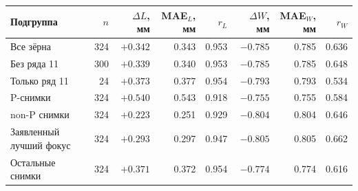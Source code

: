\begin{tabular}{@{}lrrrrrrr@{}}
\toprule
Подгруппа & $n$ & $\Delta L$, мм & MAE$_L$, мм & $r_L$ &
$\Delta W$, мм & MAE$_W$, мм & $r_W$ \\
\midrule
Все зёрна & 324 & $+\num{0.342}$ & \num{0.343} & \num{0.953} & $-\num{0.785}$ & \num{0.785} & \num{0.636} \\
Без ряда 11 & 300 & $+\num{0.339}$ & \num{0.340} & \num{0.953} & $-\num{0.785}$ & \num{0.785} & \num{0.648} \\
Только ряд 11 & 24 & $+\num{0.373}$ & \num{0.377} & \num{0.954} & $-\num{0.793}$ & \num{0.793} & \num{0.534} \\
P-снимки & 324 & $+\num{0.540}$ & \num{0.543} & \num{0.918} & $-\num{0.755}$ & \num{0.755} & \num{0.584} \\
non-P снимки & 324 & $+\num{0.223}$ & \num{0.251} & \num{0.929} & $-\num{0.804}$ & \num{0.804} & \num{0.646} \\
Заявленный лучший фокус & 324 & $+\num{0.293}$ & \num{0.297} & \num{0.947} & $-\num{0.805}$ & \num{0.805} & \num{0.662} \\
Остальные снимки & 324 & $+\num{0.371}$ & \num{0.372} & \num{0.954} & $-\num{0.774}$ & \num{0.774} & \num{0.616} \\
\bottomrule
\end{tabular}
